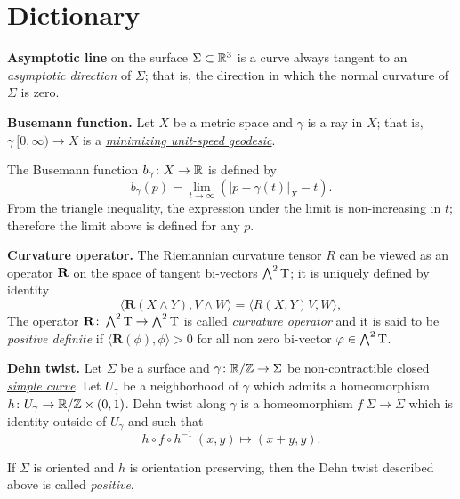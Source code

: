 \chapter{Dictionary}

\begin{description}

\item{\bf Asymptotic line}\label{Asymptotic line} on the surface $\Sigma\subset \mathbb{R}^3$
is a curve always tangent to an \emph{asymptotic direction} of $\Sigma$; 
that is, the direction in which the normal curvature of $\Sigma$ is zero.

\item{\bf Busemann function.}\label{Busemann function} 
Let $X$ be a metric space
and $\gamma$ is a ray in $X$; 
that is, $\gamma\:[0, \infty)\to X$ is a \hyperref[Geodesic]{\emph{minimizing unit-speed geodesic}}.

The Busemann function $b_\gamma\colon X\to\mathbb{R}$ is defined by
$$b_\gamma(p)=\lim_{t\to\infty}\left(|p-\gamma(t)|_X-t\right).$$
From the triangle inequality, 
the expression under the limit is non-increasing in $t$; 
therefore  the limit above is defined for any $p$.

\item{\bf Curvature operator.}\label{Curvature operator}
The Riemannian curvature tensor $R$
can be viewed as an operator $\text{\bf R}$ on the space of tangent bi-vectors $\bigwedge^2 \mathrm{T}$;
it is uniquely defined by identity
$$\langle\mathbf{R}(X\wedge Y),V\wedge W\rangle
=
\langle R(X,Y)V,W\rangle,$$
The operator $\mathbf{R}\colon\bigwedge^2 \mathrm{T}\to \bigwedge^2 \mathrm{T}$ is called \emph{curvature operator} and it is said to be \emph{positive definite} if
$\langle\mathbf{R}(\phi),\phi\rangle>0$ for all non zero
bi-vector $\varphi\in\bigwedge^2 \mathrm{T}$.

\item{\bf Dehn twist.}\label{Dehn twist}
Let $\Sigma$ be a surface and $\gamma\colon\mathbb{R}/\mathbb{Z}\to\Sigma$ be non-contractible closed \hyperref[Simple curve]{\emph{simple curve}}.
Let $U_\gamma$ be a neighborhood of $\gamma$ which admits a homeomorphism $h\colon U_\gamma\to \mathbb{R}/\mathbb{Z}\times (0,1)$.
Dehn twist along $\gamma$ is a homeomorphism $f\:\Sigma\to\Sigma$
which is identity outside of $U_\gamma$ and 
such that
$$h\circ f\circ h^{-1}\:(x,y)\mapsto(x+y,y).$$

If $\Sigma$ is oriented 
and $h$ is orientation preserving,
then the Dehn twist described above is called \emph{positive}.


\end{description}

